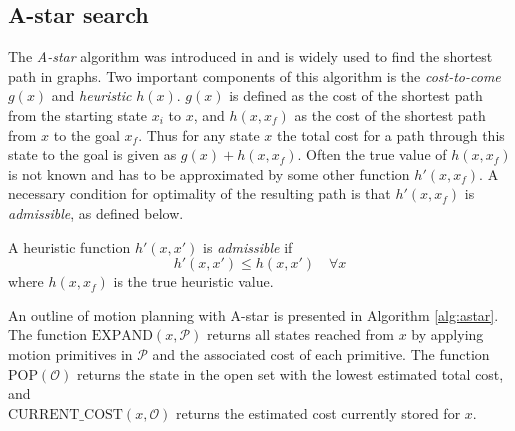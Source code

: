 \subsection{A-star search}\label{sec:a-star}
The \textit{A-star} algorithm was introduced in \cite{astar} and is widely used to find the shortest path in graphs.
Two important components of this algorithm is the \textit{cost-to-come} $g(x)$ and \textit{heuristic} $h(x)$. $g(x)$ is defined as 
the cost of the shortest path from the starting state $x_i$ to $x$, and $h(x, x_f)$ as the cost of the shortest path from $x$ to the goal $x_f$.
Thus for any state $x$ the total cost for a path through this state to the goal is given as $g(x)+h(x,x_f)$.
Often the true value of $h(x, x_f)$ is not known and has to be approximated by some other function $h'(x, x_f)$. A necessary 
condition for optimality of the resulting path is that $h'(x, x_f)$ is \textit{admissible}, as defined below.

\begin{definition}
    A heuristic function $h'(x, x')$ is \textit{admissible} if
    \begin{equation}
        h'(x, x')\leq h(x, x') \quad\forall x
    \end{equation}
    where $h(x, x_f)$ is the true heuristic value.    
\end{definition}

An outline of motion planning with A-star is presented in Algorithm \ref{alg:astar}.
The function $\text{EXPAND}(x, \mathcal{P})$ returns all states reached from $x$ by applying motion primitives in $\mathcal{P}$ and the associated cost of each primitive. The function $\text{POP}(\mathcal{O})$ returns the state in
the open set with the lowest estimated total cost, 
and \\$\text{CURRENT\_COST}(x,\mathcal{O})$  returns the estimated cost currently stored for $x$. 



